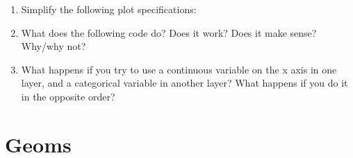 \begin{enumerate}
\def\labelenumi{\arabic{enumi}.}
\item
  Simplify the following plot specifications:

\begin{Shaded}
\begin{Highlighting}[]
\OperatorTok{+}\StringTok{ }
\StringTok{  }\NormalTok{(}\OperatorTok{$}\OperatorTok{$}

\NormalTok{() }\OperatorTok{+}\StringTok{ }
\StringTok{ }\NormalTok{(} \NormalTok{(}\OperatorTok{+}
\StringTok{ }\NormalTok{(} 

\OperatorTok{+}\StringTok{ }
\StringTok{  }\NormalTok{(}\NormalTok{(}
\end{Highlighting}
\end{Shaded}
\item
  What does the following code do? Does it work? Does it make sense?
  Why/why not?

\begin{Shaded}
\begin{Highlighting}[]
\OperatorTok{+}
\StringTok{  }\NormalTok{(}\OperatorTok{+}\StringTok{ }
\StringTok{  }\NormalTok{(}
\end{Highlighting}
\end{Shaded}
\item
  What happens if you try to use a continuous variable on the x axis in
  one layer, and a categorical variable in another layer? What happens
  if you do it in the opposite order?
\end{enumerate}

\hypertarget{sec:geom}{%
\section{Geoms}\label{sec:geom}}

